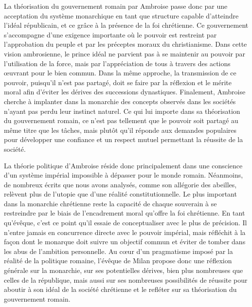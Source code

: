 La théorisation du gouvernement romain par Ambroise passe donc par une acceptation du système monarchique en tant que structure capable d'atteindre l'idéal républicain, et ce grâce à la présence de la foi chrétienne. Ce gouvernement s'accompagne d'une exigence importante où le pouvoir est restreint par l'approbation du peuple et par les préceptes moraux du christianisme. Dans cette vision ambrosienne, le prince idéal ne parvient pas à se maintenir au pouvoir par l'utilisation de la force, mais par l'appréciation de tous à travers des actions œuvrant pour le bien commun. Dans la même approche, la transmission de ce pouvoir, puisqu'il n'est pas partagé, doit se faire par la réflexion et le mérite moral afin d'éviter les dérives des successions dynastiques. Finalement, Ambroise cherche à implanter dans la monarchie des concepts observés dans les sociétés n'ayant pas perdu leur instinct naturel. Ce qui lui importe dans sa théorisation du gouvernement romain, ce n'est pas tellement que le pouvoir soit partagé au même titre que les tâches, mais plutôt qu'il réponde aux demandes populaires pour développer une confiance et un respect mutuel permettant la réussite de la société.

\bigskip

La théorie politique d'Ambroise réside donc principalement dans une conscience d'un système impérial impossible à dépasser pour le monde romain. Néanmoins, de nombreux écrits que nous avons analysés, comme son allégorie des abeilles, relèvent plus de l'utopie que d'une réalité constitutionnelle. Le plus important dans la monarchie chrétienne reste la capacité de chaque souverain à se restreindre par le biais de l'encadrement moral qu'offre la foi chrétienne. En tant qu'évêque, c'est ce point qu'il essaie de conceptualiser avec le plus de précision. Il n'entre jamais en concurrence directe avec le pouvoir impérial, mais réfléchit à la façon dont le monarque doit suivre un objectif commun et éviter de tomber dans les abus de l'ambition personnelle. Au cœur d'un pragmatisme imposé par la réalité de la politique romaine, l'évêque de Milan propose donc une réflexion générale sur la monarchie, sur ses potentielles dérives, bien plus nombreuses que celles de la république, mais aussi sur ses nombreuses possibilités de réussite pour aboutir à son idéal de la société chrétienne et le refléter sur sa théorisation du gouvernement romain.

\bigskip
